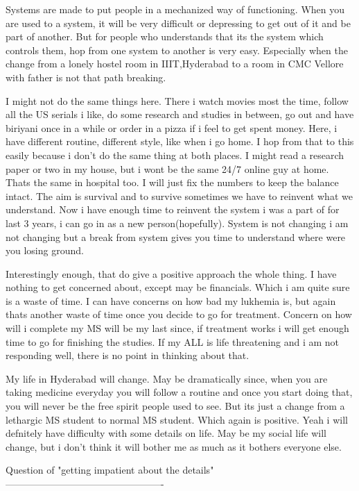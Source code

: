 Systems are made to put people in a mechanized way of functioning. When you are used to a system, it will be very difficult or depressing to get out of it and be part of another. But for people who understands that its the system which controls them, hop from one system to another is very easy. Especially when the change from a lonely hostel room in IIIT,Hyderabad to a room in CMC Vellore with father is not that path breaking. 

I might not do the same things here. There i watch movies most the time, follow all the US serials i like, do some research and studies in between, go out and have biriyani once in a while or order in a pizza if i feel to get spent money. Here, i have different routine, different style, like when i go home. I hop from that to this easily because i don't do the same thing at both places. I might read a research paper or two in my house, but i wont be the same 24/7 online guy at home. Thats the same in hospital too. I will just fix the numbers to keep the balance intact. The aim is survival and to survive sometimes we have to reinvent what we understand. Now i have enough time to reinvent the system i was a part of for last 3 years, i can go in as a new person(hopefully). System is not changing i am not changing but a break from system gives you time to understand where were you losing ground.

Interestingly enough, that do give a positive approach the whole thing. I have nothing to get concerned about, except may be financials. Which i am quite sure is a waste of time. I can have concerns on how bad my lukhemia is, but again thats another waste of time once you decide to go for treatment. Concern on how will i complete my MS will be my last since, if treatment works i will get enough time to go for finishing the studies. If my ALL is life threatening and i am not responding well, there is no point in thinking about that.

My life in Hyderabad will change. May be dramatically since, when you are taking medicine everyday you will follow a routine and once you start doing that, you will never be the free spirit people used to see. But its just a change from a lethargic MS student to normal MS student. Which again is positive. Yeah i will defnitely have difficulty with some details on life. May be my social life will change, but i don't think it will bother me as much as it bothers everyone else.

Question of "getting impatient about the details"
-------------------------------------------------

